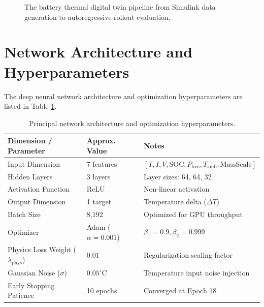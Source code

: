 \documentclass[12pt,a4paper]{article}
\begin{document}
\begin{figure}[htbp]
\centering
{}
\caption{The battery thermal digital twin pipeline from Simulink data generation to autoregressive rollout evaluation.}
\label{fig:pipeline}
\end{figure}

\section{Network Architecture and Hyperparameters}
The deep neural network architecture and optimization hyperparameters are listed in Table \ref{tab:hyperparams}.

\begin{table}[h]
\centering
\caption{Principal network architecture and optimization hyperparameters.}
\label{tab:hyperparams}
\begin{tabularx}{\textwidth}{@{}l l X@{}}
\toprule
Dimension / Parameter & Approx. Value & Notes \\
\midrule
Input Dimension & 7 features & $[T, I, V, \text{SOC}, P_{\text{loss}}, T_{\text{amb}}, \text{MassScale}]$ \\
Hidden Layers & 3 layers & Layer sizes: 64, 64, 32 \\
Activation Function & ReLU & Non-linear activation \\
Output Dimension & 1 target & Temperature delta ($\Delta T$) \\
Batch Size & 8,192 & Optimized for GPU throughput \\
Optimizer & Adam ($\alpha = 0.001$) & $\beta_1 = 0.9, \beta_2 = 0.999$ \\
Physics Loss Weight ($\lambda_{\text{phys}}$) & $0.01$ & Regularization scaling factor \\
Gaussian Noise ($\sigma$) & $0.05^\circ\text{C}$ & Temperature input noise injection \\
Early Stopping Patience & 10 epochs & Converged at Epoch 18 \\
\bottomrule
\end{tabularx}
\end{table}
\end{document}

